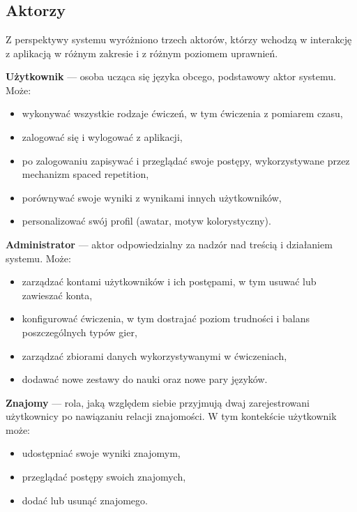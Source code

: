 \documentclass[polish]{aghengthesis}
\begin{document}

\chapter{\ChapterTitleScope}
\label{sec:zakres-funkcjonalnosci}

\section{Aktorzy}
Z perspektywy systemu wyróżniono trzech aktorów, którzy wchodzą w interakcję
z aplikacją w różnym zakresie i z różnym poziomem uprawnień.

\textbf{Użytkownik} — osoba ucząca się języka obcego, podstawowy aktor systemu.
Może:
\begin{itemize}
    \item wykonywać wszystkie rodzaje ćwiczeń, w tym ćwiczenia z pomiarem czasu,
    \item zalogować się i wylogować z aplikacji,
    \item po zalogowaniu zapisywać i przeglądać swoje postępy, wykorzystywane
    przez mechanizm spaced repetition,
    \item porównywać swoje wyniki z wynikami innych użytkowników,
    \item personalizować swój profil (awatar, motyw kolorystyczny).
\end{itemize}

\textbf{Administrator} — aktor odpowiedzialny za nadzór nad treścią
i działaniem systemu. Może:
\begin{itemize}
    \item zarządzać kontami użytkowników i ich postępami, w tym usuwać lub
    zawieszać konta,
    \item konfigurować ćwiczenia, w tym dostrajać poziom trudności i balans
    poszczególnych typów gier,
    \item zarządzać zbiorami danych wykorzystywanymi w ćwiczeniach,
    \item dodawać nowe zestawy do nauki oraz nowe pary języków.
\end{itemize}

\textbf{Znajomy} — rola, jaką względem siebie przyjmują dwaj zarejestrowani
użytkownicy po nawiązaniu relacji znajomości. W tym kontekście użytkownik
może:
\begin{itemize}
    \item udostępniać swoje wyniki znajomym,
    \item przeglądać postępy swoich znajomych,
    \item dodać lub usunąć znajomego.
\end{itemize}
\end{document}
